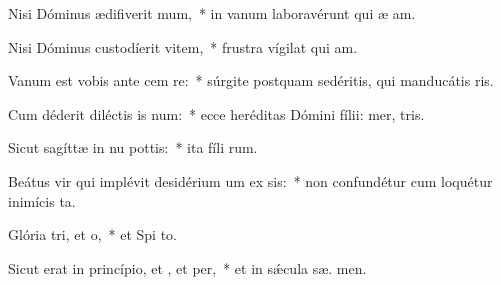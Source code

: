 \item Nisi Dóminus ædifiverit mum,~* in vanum laboravérunt qui æ am.
\item Nisi Dóminus custodíerit vitem,~* frustra vígilat qui  am.
\item Vanum est vobis ante cem re:~* súrgite postquam sedéritis, qui manducátis  ris.
\item Cum déderit diléctis is num:~* ecce heréditas Dómini fílii: mer,  tris.
\item Sicut sagíttæ in nu pottis:~* ita fíli rum.
\item Beátus vir qui implévit desidérium um ex sis:~* non confundétur cum loquétur inimícis   ta.
\item Glória tri, et o,~* et Spi to.
\item Sicut erat in princípio, et , et per,~* et in sǽcula sæ. men.
